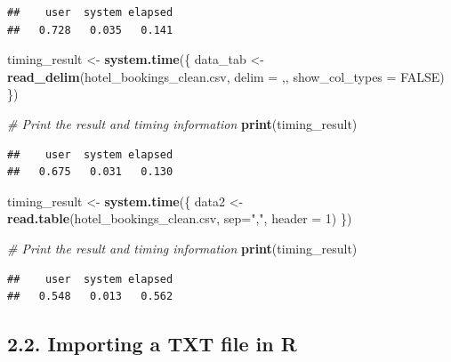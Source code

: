\documentclass[
]{article}
\newenvironment{Shaded}{\begin{snugshade}}{\end{snugshade}}
\newcommand{\AttributeTok}[1]{\textcolor[rgb]{0.13,0.29,0.53}{#1}}
\newcommand{\CommentTok}[1]{\textcolor[rgb]{0.56,0.35,0.01}{\textit{#1}}}
\newcommand{\ConstantTok}[1]{\textcolor[rgb]{0.56,0.35,0.01}{#1}}
\newcommand{\DecValTok}[1]{\textcolor[rgb]{0.00,0.00,0.81}{#1}}
\newcommand{\FunctionTok}[1]{\textcolor[rgb]{0.13,0.29,0.53}{\textbf{#1}}}
\newcommand{\NormalTok}[1]{#1}
\newcommand{\OtherTok}[1]{\textcolor[rgb]{0.56,0.35,0.01}{#1}}
\newcommand{\StringTok}[1]{\textcolor[rgb]{0.31,0.60,0.02}{#1}}
\begin{document}
\begin{verbatim}
##    user  system elapsed 
##   0.728   0.035   0.141
\end{verbatim}

\begin{Shaded}
\begin{Highlighting}[]
\NormalTok{timing\_result }\OtherTok{\textless{}{-}} \FunctionTok{system.time}\NormalTok{(\{}
\NormalTok{    data\_tab }\OtherTok{\textless{}{-}} \FunctionTok{read\_delim}\NormalTok{(}\StringTok{\textquotesingle{}hotel\_bookings\_clean.csv\textquotesingle{}}\NormalTok{, }\AttributeTok{delim =} \StringTok{\textquotesingle{},\textquotesingle{}}\NormalTok{, }\AttributeTok{show\_col\_types =} \ConstantTok{FALSE}\NormalTok{)}
\NormalTok{\})}

\CommentTok{\# Print the result and timing information}
\FunctionTok{print}\NormalTok{(timing\_result)}
\end{Highlighting}
\end{Shaded}

\begin{verbatim}
##    user  system elapsed 
##   0.675   0.031   0.130
\end{verbatim}

\begin{Shaded}
\begin{Highlighting}[]
\NormalTok{timing\_result }\OtherTok{\textless{}{-}} \FunctionTok{system.time}\NormalTok{(\{}
\NormalTok{    data2 }\OtherTok{\textless{}{-}} \FunctionTok{read.table}\NormalTok{(}\StringTok{\textquotesingle{}hotel\_bookings\_clean.csv\textquotesingle{}}\NormalTok{, }\AttributeTok{sep=}\StringTok{","}\NormalTok{, }\AttributeTok{header =} \DecValTok{1}\NormalTok{)}
\NormalTok{\})}

\CommentTok{\# Print the result and timing information}
\FunctionTok{print}\NormalTok{(timing\_result)}
\end{Highlighting}
\end{Shaded}

\begin{verbatim}
##    user  system elapsed 
##   0.548   0.013   0.562
\end{verbatim}

\hypertarget{importing-a-txt-file-in-r}{%
\subsection{2.2. Importing a TXT file in
R}\label{importing-a-txt-file-in-r}}
\end{document}
